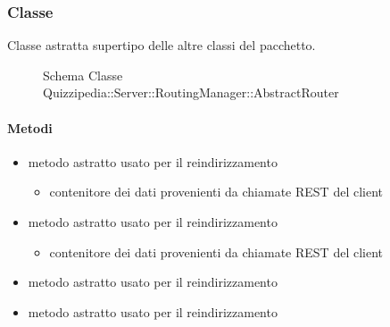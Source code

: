 \subsubsection{Classe }
Classe astratta supertipo delle altre classi del pacchetto.
\begin{figure}[H]
\centering
\noindent{}
\caption[Schema Classe AbstractRouter]{Schema Classe Quizzipedia::Server::RoutingManager::AbstractRouter}
\end{figure}
\paragraph{Metodi}
\begin{itemize}
\item {}
\newline
metodo astratto usato per il reindirizzamento
\newline
{}
\newline
\begin{itemize}
\item {}
\newline
contenitore dei dati provenienti da chiamate REST del client
\end{itemize}
\item {}
\newline
metodo astratto usato per il reindirizzamento
\newline
{}
\newline
\begin{itemize}
\item {}
\newline
contenitore dei dati provenienti da chiamate REST del client
\end{itemize}
\item {}
\newline
metodo astratto usato per il reindirizzamento
\newline
\item {}
\newline
metodo astratto usato per il reindirizzamento
\newline
\end{itemize}
